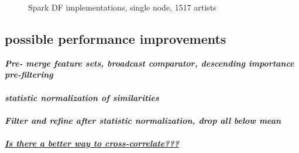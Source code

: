\FloatBarrier
\begin{figure}[htbp]
	\centering
	\caption{Spark DF implementations, single node, 1517 artists}
	\label{fig:spark2}
\end{figure}
\FloatBarrier

\subsection{possible performance improvements}

\textit{\textbf{Pre- merge feature sets, broadcast comparator, descending importance pre-filtering\\}}
\\
\textit{\textbf{statistic normalization of similarities\\}}
\ \\
\textit{\textbf{Filter and refine after statistic normalization, drop all below mean\\}}
\ \\
\textit{\textbf{\underline{Is there a better way to cross-correlate???}\\}}
\ \\

